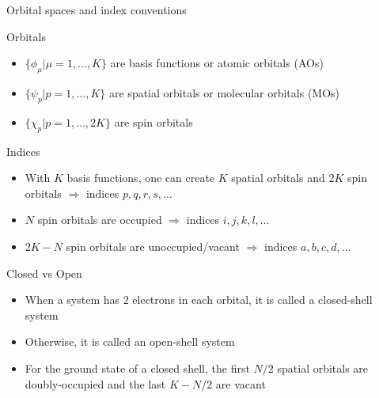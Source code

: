 \documentclass[aspectratio=169,9pt]{beamer}
\newcommand{\red}[1]{\textcolor{hfRed}{#1}}
\newcommand{\orange}[1]{\textcolor{hfOrange}{#1}}
\newcommand{\green}[1]{\textcolor{hfGreen}{#1}}
\newcommand{\violet}[1]{\textcolor{hfViolet}{#1}}
\begin{document}
\begin{frame}{Orbital spaces and index conventions}
	\begin{block}{Orbitals}
		\begin{itemize}
			\item $\{ \phi_{\mu} | \mu=1,\ldots,K \}$ are \green{basis functions} or \green{atomic orbitals (AOs)}
			\item $\{ \psi_p | p=1,\ldots,K \}$ are \violet{spatial orbitals} or \violet{molecular orbitals (MOs)}
			\item $\{ \chi_p | p=1,\ldots,2K \}$ are \orange{spin orbitals}
		\end{itemize}
	\end{block}
	\begin{block}{Indices}
		\begin{itemize}
			\item With $K$ \green{basis functions}, one can create $K$ \violet{spatial orbitals} and $2K$ \orange{spin orbitals} $\Rightarrow$ \red{indices $p,q,r,s,\ldots$} 
			\item $N$ \orange{spin orbitals} are \red{occupied} $\Rightarrow$ \red{indices $i,j,k,l,\ldots$} 
			\item $2K-N$ \orange{spin orbitals} are \red{unoccupied/vacant} $\Rightarrow$ \red{indices $a,b,c,d,\ldots$}
		\end{itemize}
	\end{block}
	\begin{block}{Closed vs Open}
		\begin{itemize}
			\item When a system has \red{$2$ electrons in each orbital}, it is called a \red{closed-shell} system 
			\item Otherwise, it is called an \red{open-shell} system 
			\item For the ground state of a closed shell, the first $N/2$ spatial orbitals are \red{doubly-occupied} and the last $K-N/2$ are \red{vacant}
		\end{itemize}
	\end{block}
\end{frame}
\end{document}

